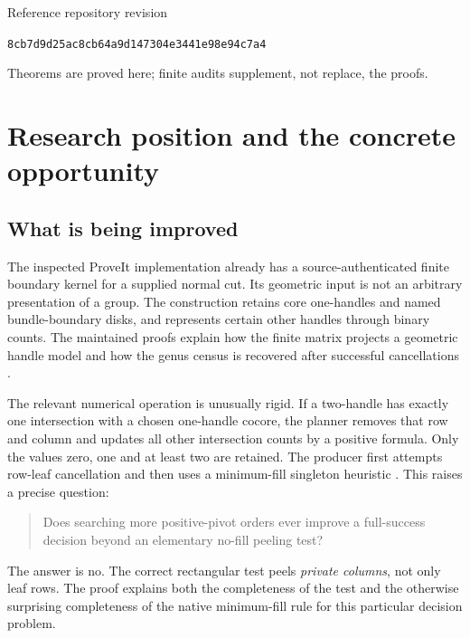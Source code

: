 \documentclass[11pt]{article}
\theoremstyle{definition}\newtheorem{definition}[theorem]{Definition}
\theoremstyle{remark}\newtheorem{remark}[theorem]{Remark}
\newcommand{\pin}{\texttt{8cb7d9d25ac8cb64a9d147304e3441e98e94c7a4}}
\begin{document}
\begin{titlepage}
\begin{minipage}{0.96\textwidth}
\begin{abstract}
The package includes 34 passing unit tests, an exhaustive 31,907-matrix audit, 1,241 optimal-deferral checks, reproducible paired measurements, and a hash-guarded integration proposal. No complete knot benchmark or production-checkout patch application was run. The results improve a local operator and identify its exact boundary; they do not assert a general quasi-polynomial unknot-recognition bound.
\end{abstract}
\end{minipage}
\vfill
{\small Reference repository revision}\par
{\small\pin}\par
\vspace{0.15in}
{\small Theorems are proved here; finite audits supplement, not replace, the proofs.}
\end{titlepage}
\begingroup
\small
\setlength{\parskip}{0pt}
\tableofcontents
\endgroup
\clearpage

\section{Research position and the concrete opportunity}
\label{sec:position}

\subsection{What is being improved}
The inspected ProveIt implementation already has a source-authenticated finite boundary kernel for a supplied normal cut. Its geometric input is not an arbitrary presentation of a group. The construction retains core one-handles and named bundle-boundary disks, and represents certain other handles through binary counts. The maintained proofs explain how the finite matrix projects a geometric handle model and how the genus census is recovered after successful cancellations \cite{repo-kernel,repo-primitive}.

The relevant numerical operation is unusually rigid. If a two-handle has exactly one intersection with a chosen one-handle cocore, the planner removes that row and column and updates all other intersection counts by a positive formula. Only the values zero, one and at least two are retained. The producer first attempts row-leaf cancellation and then uses a minimum-fill singleton heuristic \cite{repo-core,repo-bundle}. This raises a precise question:
\begin{quote}
Does searching more positive-pivot orders ever improve a full-success decision beyond an elementary no-fill peeling test?
\end{quote}
The answer is no. The correct rectangular test peels \emph{private columns}, not only leaf rows. The proof explains both the completeness of the test and the otherwise surprising completeness of the native minimum-fill rule for this particular decision problem.
\end{document}
